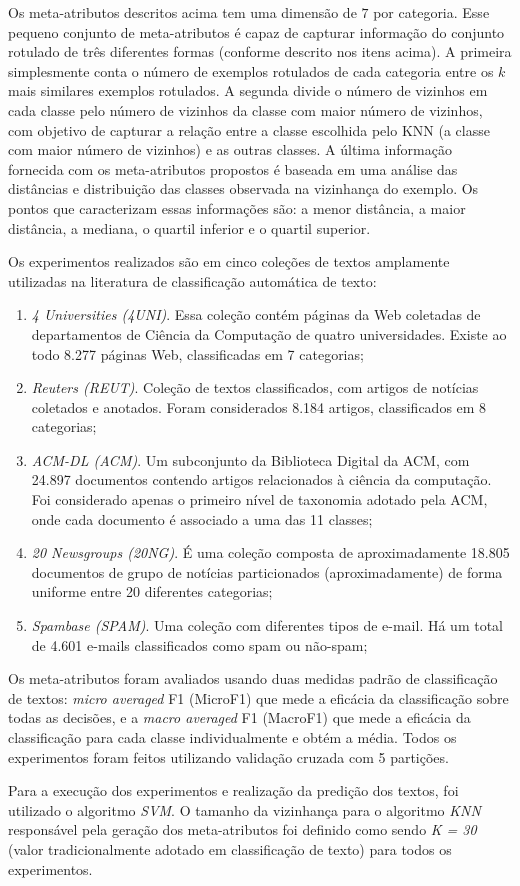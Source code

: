 Os meta-atributos descritos acima tem uma dimensão de $7$ por categoria. Esse pequeno conjunto de meta-atributos é capaz de capturar informação do conjunto rotulado de três diferentes formas (conforme descrito nos itens acima). A primeira simplesmente conta o número de exemplos rotulados de cada categoria entre os $k$ mais similares exemplos rotulados. A segunda divide o número de vizinhos em cada classe pelo número de vizinhos da classe com maior número de vizinhos, com objetivo de capturar a relação entre a classe escolhida pelo KNN (a classe com maior número de vizinhos) e as outras classes. A última informação fornecida com os meta-atributos propostos é baseada em uma análise das distâncias e distribuição das classes observada na vizinhança do exemplo. Os pontos que caracterizam essas informações são: a menor distância, a maior distância, a mediana, o quartil inferior e o quartil superior.

Os experimentos realizados são em cinco coleções de textos amplamente utilizadas na literatura de classificação automática de texto:

\begin{enumerate}
    \item \textit{4 Universities (4UNI)}. Essa coleção contém páginas da Web coletadas de departamentos de Ciência da Computação de quatro universidades. Existe ao todo 8.277 páginas Web, classificadas em 7 categorias;
    \item \textit{Reuters (REUT)}. Coleção de textos classificados, com artigos de notícias coletados e anotados. Foram considerados 8.184 artigos, classificados em 8 categorias;
    \item \textit{ACM-DL (ACM)}. Um subconjunto da Biblioteca Digital da ACM, com 24.897 documentos contendo artigos relacionados à ciência da computação. Foi considerado apenas o primeiro nível de taxonomia adotado pela ACM, onde cada documento é associado a uma das 11 classes;
    \item \textit{20 Newsgroups (20NG)}. É uma coleção composta de aproximadamente 18.805 documentos de grupo de notícias particionados (aproximadamente) de forma uniforme entre 20 diferentes categorias;
    \item \textit{Spambase (SPAM)}. Uma coleção com diferentes tipos de e-mail. Há um total de 4.601 e-mails classificados como spam ou não-spam;
\end{enumerate}

Os meta-atributos foram avaliados usando duas medidas padrão de classificação de textos: \textit{micro averaged} F1 (MicroF1) que mede a eficácia da classificação sobre todas as decisões, e a \textit{macro averaged} F1 (MacroF1) que mede a eficácia da classificação para cada classe individualmente e obtém a média. Todos os experimentos foram feitos utilizando validação cruzada com 5 partições.

Para a execução dos experimentos e realização da predição dos textos, foi utilizado o algoritmo \textit{SVM}. O tamanho da vizinhança para o algoritmo \textit{KNN} responsável pela geração dos meta-atributos foi definido como sendo \textit{K = 30} (valor tradicionalmente adotado em classificação de texto) para todos os experimentos.
